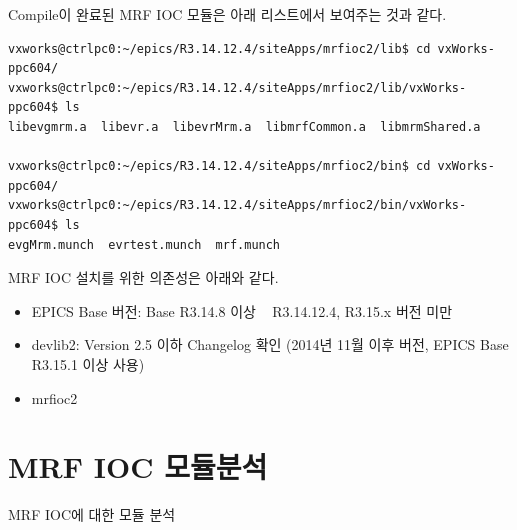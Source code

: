 \documentclass[11pt
  , a4paper
  , article
  , oneside
]{memoir}
\begin{document}
Compile이 완료된 MRF IOC 모듈은 아래 리스트에서 보여주는 것과 같다.
\begin{lstlisting}[style=termstyle]
vxworks@ctrlpc0:~/epics/R3.14.12.4/siteApps/mrfioc2/lib$ cd vxWorks-ppc604/
vxworks@ctrlpc0:~/epics/R3.14.12.4/siteApps/mrfioc2/lib/vxWorks-ppc604$ ls
libevgmrm.a  libevr.a  libevrMrm.a  libmrfCommon.a  libmrmShared.a

vxworks@ctrlpc0:~/epics/R3.14.12.4/siteApps/mrfioc2/bin$ cd vxWorks-ppc604/
vxworks@ctrlpc0:~/epics/R3.14.12.4/siteApps/mrfioc2/bin/vxWorks-ppc604$ ls
evgMrm.munch  evrtest.munch  mrf.munch
\end{lstlisting}

MRF IOC 설치를 위한 의존성은 아래와 같다.
\begin{itemize}
	\item EPICS Base 버전: Base R3.14.8 이상 ~ R3.14.12.4, R3.15.x 버전 미만
	\item devlib2: Version 2.5 이하 Changelog 확인 (2014년 11월 이후 버전, EPICS Base R3.15.1 이상 사용)
	\item mrfioc2
\end{itemize}


\chapter{MRF IOC 모듈분석}
MRF IOC에 대한 모듈 분석


\clearpage


\end{document}
